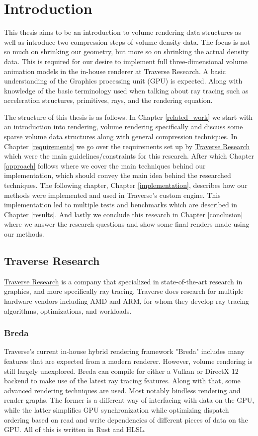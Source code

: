 \section{Introduction} \label{introduction}
This thesis aims to be an introduction to volume rendering data structures as well as introduce two compression steps of volume density data. The focus is not so much on shrinking our geometry, but more so on shrinking the actual density data. This is required for our desire to implement full three-dimensional volume animation models in the in-house renderer at Traverse Research. A basic understanding of the Graphics processing unit (GPU) is expected. Along with knowledge of the basic terminology used when talking about ray tracing such as acceleration structures, primitives, rays, and the rendering equation.

The structure of this thesis is as follows. In Chapter \ref{related_work} we start with an introduction into rendering, volume rendering specifically and discuss some sparse volume data structures along with general compression techniques. In Chapter \ref{requirements} we go over the requirements set up by \href{https://traverseresearch.nl/}{Traverse Research} which were the main guidelines/constraints for this research. After which Chapter \ref{approach} follows where we cover the main techniques behind our implementation, which should convey the main idea behind the researched techniques.  The following chapter, Chapter \ref{implementation}, describes how our methods were implemented and used in Traverse's custom engine. This implementation led to multiple tests and benchmarks which are described in Chapter \ref{results}. And lastly we conclude this research in Chapter \ref{conclusion} where we answer the research questions and show some final renders made using our methods.


\subsection{Traverse Research} \label{introduction:traverse_research}
\href{https://traverseresearch.nl/}{Traverse Research} is a company that specialized in state-of-the-art research in graphics, and more specifically ray tracing. Traverse does research for multiple hardware vendors including AMD and ARM, for whom they develop ray tracing algorithms, optimizations, and workloads.
\subsubsection{Breda} \label{introduction:traverse_research:breda}
Traverse's current in-house hybrid rendering framework "Breda" includes many features that are expected from a modern renderer. However, volume rendering is still largely unexplored. Breda can compile for either a Vulkan or DirectX 12 backend to make use of the latest ray tracing features. Along with that, some advanced rendering techniques are used. Most notably bindless rendering\cite{BindlessRenderingSetup} and render graphs\cite{RenderGraph101}. The former is a different way of interfacing with data on the GPU, while the latter simplifies GPU synchronization while optimizing dispatch ordering based on read and write dependencies of different pieces of data on the GPU. All of this is written in Rust and HLSL.
